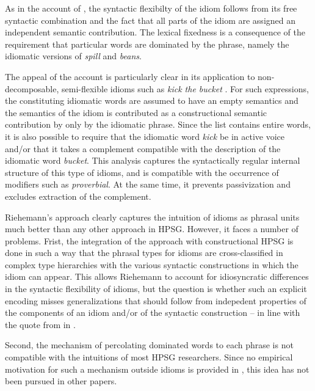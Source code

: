 \documentclass[output=paper]{langsci/langscibook}
\begin{document}
As in the account of \cite{KE94a}, the syntactic flexibilty of the idiom follows from its free syntactic combination and the fact that all parts of the idiom are assigned an independent semantic contribution. The lexical fixedness is a consequence of the requirement that particular words are dominated by the phrase, namely the idiomatic versions of \emph{spill} and \emph{beans}.

The appeal of the account is particularly clear in its application to non-de\-com\-posable, semi-flexible idioms such as \emph{kick the bucket} \citep[]{Riehemann2001a}. 
For such expressions, the constituting idiomatic words are assumed to have an empty semantics and the semantics of the idiom is contributed as a constructional semantic contribution by only by the idiomatic phrase. 
Since the  list contains entire words, it is also possible to require that the idiomatic word \emph{kick} be in active voice and/or that it takes a complement compatible with the description of the idiomatic word \emph{bucket}.
This analysis captures the syntactically regular internal structure of this type of idioms, and is compatible with the occurrence of modifiers such as \emph{proverbial}. At the same time, it prevents passivization and excludes extraction of the complement.

Riehemann's approach clearly captures the intuition of idioms as phrasal units much better than any other approach in HPSG. 
However, it faces a number of problems.
Frist, the integration of the approach with constructional HPSG is done in such a way that the phrasal types for idioms are cross-classified in complex type hierarchies with the various syntactic constructions in which the idiom can appear. 
This allows Riehemann to account for idiosyncratic differences in the syntactic flexibility of idioms, but the question is whether such an explicit encoding misses generalizations that should follow from indepedent properties of the components of an idiom and/or of the syntactic construction -- in line with the quote from \cite{NSW94a} in .


Second, the mechanism of percolating dominated words to each phrase is not compatible with the intuitions of most HPSG researchers. 
Since no empirical motivation for such a mechanism outside idioms is provided in \cite{Riehemann2001a}, this idea has not been pursued in other papers. 
\end{document}
